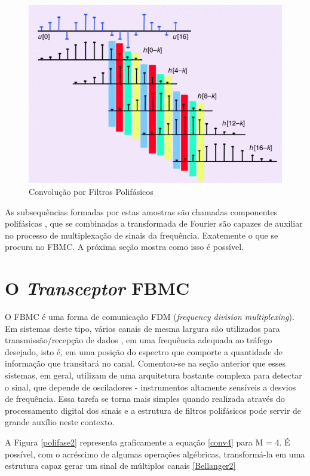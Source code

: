\begin{figure}[h!]
\centering
\includegraphics[width=4.5in]{olar.png}
\caption{Convolução por Filtros Polifásicos \cite{Krishna}}
\label{polifase}
\end{figure} 

\par As subsequências formadas por estas amostras são chamadas componentes polifásicas \cite{Krishna}, que se combinadas a transformada de Fourier são capazes de auxiliar no processo de multiplexação de sinais da frequência. Exatemente o que se procura no FBMC. A próxima seção mostra como isso é possível. 

\section{O \textit{Transceptor} FBMC}

\par O FBMC é uma forma de comunicação FDM (\textit{frequency division multiplexing}). Em sistemas deste tipo, vários canais de mesma largura são utilizados para transmissão/recepção de dados \cite{Krishna}, em uma frequência adequada ao tráfego desejado, isto é, em uma posição do espectro que comporte a quantidade de informação que transitará no canal. Comentou-se na seção anterior que esses sistemas, em geral, utilizam de uma arquitetura bastante complexa para detectar o sinal, que depende de osciladores - instrumentos altamente sensíveis a desvios de frequência. Essa tarefa se torna mais simples quando realizada através do processamento digital dos sinais e a estrutura de filtros polifásicos pode servir de grande auxílio neste contexto. 
\par A Figura \ref{polifase2} representa graficamente a equação \ref{conv4} para M = 4. É possível, com o acréscimo de algumas operações algébricas, transformá-la em uma estrutura capaz gerar um sinal de múltiplos canais \ref{Bellanger2}

